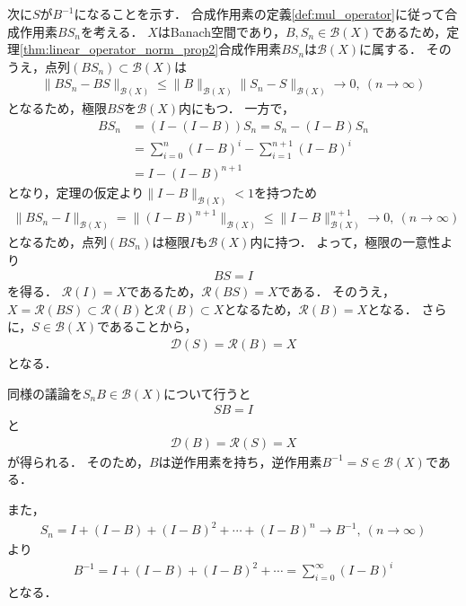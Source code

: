 \begin{Proof}
次に$S$が$B^{-1}$になることを示す．
合成作用素の定義\ref{def:mul_operator}に従って合成作用素$BS_n$を考える．
$X$はBanach空間であり，$B, S_n \in {\mathcal B}(X)$であるため，定理\ref{thm:linear_operator_norm_prop2}合成作用素$BS_n$は${\mathcal B}(X)$に属する．
そのうえ，点列$(B S_n) \subset {\mathcal B}(X)$は
\begin{align*}
  \| B S_n - B S \|_{{\mathcal B}(X)} \le \| B \|_{{\mathcal B}(X)}  \| S_n - S \|_{{\mathcal B}(X)} \rightarrow 0, ~ (n \rightarrow \infty )
\end{align*}
となるため，極限$B S$を${\mathcal B}(X)$内にもつ．
一方で，
\begin{align*}
  B S_n &= \left( I - ( I - B ) \right) S_n = S_n - (I - B) S_n \\
  &= \sum_{i=0}^n ( I - B)^i - \sum_{i=1}^{n+1} ( I - B)^i  \\
  &= I - ( I - B)^{n + 1}
\end{align*}
となり，定理の仮定より$\| I - B \|_{{\mathcal B}(X)} < 1$を持つため
\begin{align*}
  \| B S_n - I \|_{{\mathcal B}(X)} = \| ( I - B)^{n + 1} \|_{{\mathcal B}(X)} \le \| I - B \|_{{\mathcal B}(X)}^{n + 1} \rightarrow 0, ~ (n \rightarrow \infty )
\end{align*}
となるため，点列$(B S_n)$は極限$I$も${\mathcal B}(X)$内に持つ．
よって，極限の一意性より
\begin{align*}
  B S = I
\end{align*}
を得る．
${\mathcal R} ( I ) = X$であるため，${\mathcal R}(B S)=X$である．
そのうえ，$X = {\mathcal R}(B S) \subset {\mathcal R}(B)$と${\mathcal R}(B) \subset X$となるため，${\mathcal R}(B) = X$となる．
さらに，$S \in {\mathcal B}(X)$であることから，
\begin{align*}
  {\mathcal D}(S) = {\mathcal R}(B) = X
\end{align*}
となる．

同様の議論を$S_n B \in {\mathcal B}(X)$について行うと
\begin{align*}
  S B = I
\end{align*}
と
\begin{align*}
{\mathcal D}(B) = {\mathcal R}(S) = X
\end{align*}
が得られる．
そのため，$B$は逆作用素を持ち，逆作用素$B^{-1} = S \in {\mathcal B}(X)$である．

また，
\begin{align*}
S_n = I + ( I - B) + ( I - B )^2 + \cdots + ( I - B )^n \rightarrow B^{-1}, ~ (n \rightarrow \infty)
\end{align*}
より
\begin{align*}
B^{-1} = I + (I - B) + (I - B)^2 + \cdots = \sum_{i = 0}^\infty (I - B)^i
\end{align*}
となる．


\end{Proof}
